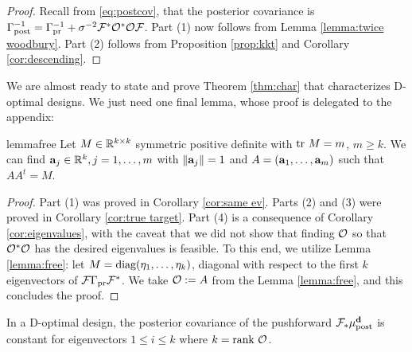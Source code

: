\begin{proof}
  Recall from \eqref{eq:postcov}, that the posterior covariance is
  $\Gamma_{\textup{post}}^{-1} = \Gamma_{\textup{pr}}^{-1} +
  \sigma^{-2}\mathcal{F}^*\mathcal{O}^*\mathcal{O}\mathcal{F}$. Part (1) now follows from Lemma
  \ref{lemma:twice woodbury}. Part (2) follows from Proposition
  \ref{prop:kkt} and Corollary \ref{cor:descending}.
\end{proof}

We are almost ready to state and prove Theorem \ref{thm:char} that
characterizes D-optimal designs. We just need one final lemma, whose
proof is delegated to the appendix:
\begin{restatable*}{lemma}{free}\label{lemma:free}
  Let $M \in \mathbb{R}^{k \times k}$ symmetric positive definite with $\textup{tr}\ M
  = m$, $m \geq k$. We can find $\mathbf{a}_j \in \mathbb{R}^k,j=1,\dots,m$
  with $\|\mathbf{a}_j\|=1$ and $A = (\mathbf{a}_1,\dots,\mathbf{a}_m)$ such that
  $AA^t = M$.
\end{restatable*}


\main

\begin{proof}
  Part (1) was proved in Corollary \ref{cor:same ev}. Parts (2) and
  (3) were proved in Corollary \ref{cor:true target}. Part (4) is a
  consequence of Corollary \ref{cor:eigenvalues}, with the caveat that
  we did not show that finding $\mathcal{O}$ so that $\mathcal{O}^*\mathcal{O}$ has the
  desired eigenvalues is feasible. To this end, we utilize Lemma
  \ref{lemma:free}: let $M = \textup{diag}(\eta_1, \dots, \eta_k)$, diagonal
  with respect to the first $k$ eigenvectors of $\mathcal{F} \Gamma_{\textup{pr}}
  \mathcal{F}^*$. We take $\mathcal{O} := A$ from the Lemma \ref{lemma:free}, and
  this concludes the proof.
\end{proof}

\begin{corollary}\label{cor:equal eigs}
  In a D-optimal design, the posterior covariance of the pushforward
  $\mathcal{F}_{*} \mu_{\textup{post}}^{\mathbf{d}}$ is constant for eigenvectors $1 \leq i \leq k$
  where $k =\textup{rank}\  \mathcal{O}$.
\end{corollary}

\optimalvsnot

